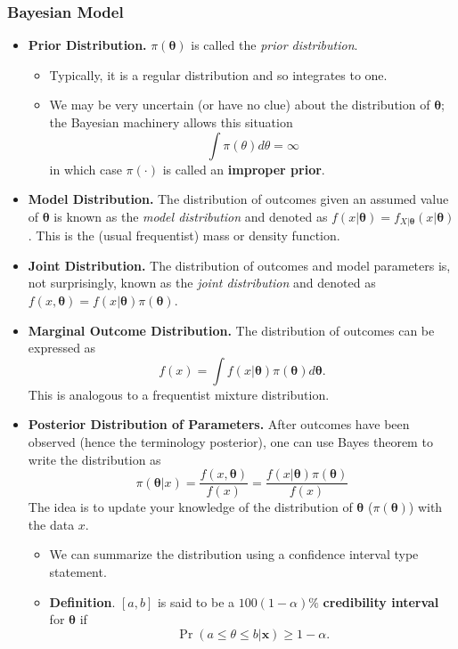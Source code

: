 \documentclass[]{book}
\begin{document}
\subsubsection{Bayesian Model}\label{bayesian-model-1}

\begin{itemize}
\item
  \textbf{Prior Distribution.} \(\pi(\boldsymbol \theta)\) is called the
  \emph{prior distribution}.

  \begin{itemize}
  \item
    Typically, it is a regular distribution and so integrates to one.
  \item
    We may be very uncertain (or have no clue) about the distribution of
    \(\boldsymbol \theta\); the Bayesian machinery allows this situation
    \[\int \pi(\theta) d\theta = \infty\] in which case \(\pi(\cdot)\)
    is called an \textbf{improper prior}.
  \end{itemize}
\item
  \textbf{Model Distribution.} The distribution of outcomes given an
  assumed value of \(\boldsymbol \theta\) is known as the \emph{model
  distribution} and denoted as
  \(f(x | \boldsymbol \theta) = f_{X|\boldsymbol \theta} (x|\boldsymbol \theta )\).
  This is the (usual frequentist) mass or density function.
\item
  \textbf{Joint Distribution.} The distribution of outcomes and model
  parameters is, not surprisingly, known as the \emph{joint
  distribution} and denoted as
  \(f(x , \boldsymbol \theta) = f(x|\boldsymbol \theta )\pi(\boldsymbol \theta)\).
\item
  \textbf{Marginal Outcome Distribution.} The distribution of outcomes
  can be expressed as
  \[f(x) =\int f(x | \boldsymbol \theta)\pi(\boldsymbol \theta) d\boldsymbol \theta.\]
  This is analogous to a frequentist mixture distribution.
\item
  \textbf{Posterior Distribution of Parameters.} After outcomes have
  been observed (hence the terminology posterior), one can use Bayes
  theorem to write the distribution as
  \[\pi(\boldsymbol \theta | x) =\frac{f(x , \boldsymbol \theta)}{f(x)} =\frac{f(x|\boldsymbol \theta )\pi(\boldsymbol \theta)}{f(x)}\]
  The idea is to update your knowledge of the distribution of
  \(\boldsymbol \theta\) (\(\pi(\boldsymbol \theta)\)) with the data
  \(x\).

  \begin{itemize}
  \item
    We can summarize the distribution using a confidence interval type
    statement.
  \item
    \textbf{Definition}. \([a,b]\) is said to be a \(100(1-\alpha)\%\)
    \textbf{credibility interval} for \(\boldsymbol \theta\) if
    \[\Pr (a \le \theta \le b | \mathbf{x}) \ge 1- \alpha.\]
  \end{itemize}
\end{itemize}
\end{document}
